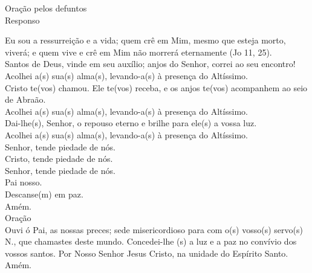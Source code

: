 \documentclass{book}
\begin{document}
\newpage
\begin{center}
    Oração pelos defuntos \\
    \hfill{} \break{}
    \textcolor{VioletRed2}{Responso}
\end{center}
\begin{flushleft}
    Eu sou a ressurreição e a vida; quem crê em Mim, mesmo que esteja morto, viverá; e quem vive e crê em Mim não morrerá eternamente (\textcolor{VioletRed2}{Jo 11, 25}).
    \vspace{.2cm} \\
    Santos de Deus, vinde em seu auxílio; anjos do Senhor, correi ao seu encontro! Acolhei a(s) sua(s) alma(s), levando-a(s) à presença do Altíssimo.
    \vspace{.2cm} \\
    \VbarRed{} Cristo te(vos) chamou. Ele te(vos) receba, e os anjos te(vos) acompanhem ao seio de Abraão. \\
    \RbarRed{} Acolhei a(s) sua(s) alma(s), levando-a(s) à presença do Altíssimo.
    \vspace{.2cm} \\
    \VbarRed{} Dai-lhe(s), Senhor, o repouso eterno e brilhe para ele(s) a vossa luz. \\
    \RbarRed{} Acolhei a(s) sua(s) alma(s), levando-a(s) à presença do Altíssimo.
    \vspace{.2cm} \\
    \VbarRed{} Senhor, tende piedade de nós. \\
    \RbarRed{} Cristo, tende piedade de nós. \\
    \VbarRed{} Senhor, tende piedade de nós.
    \vspace{.2cm} \\
    Pai nosso.
    \vspace{.2cm} \\
    \VbarRed{} Descanse(m) em paz. \\
    \RbarRed{} Amém.
    \vspace{.2cm} \\
    Oração
    \vspace{.2cm} \\
    Ouvi ó Pai, as nossas preces; sede misericordioso para com o(s) vosso(s) servo(s) \textcolor{VioletRed2}{N.}, que chamastes deste mundo. Concedei-lhe (s) a luz e a paz no convívio dos vossos santos. Por Nosso Senhor Jesus Cristo, na unidade do Espírito Santo. \\
    \RbarRed{} Amém.
    \vspace{.2cm} \\

\end{flushleft}
\end{document}
